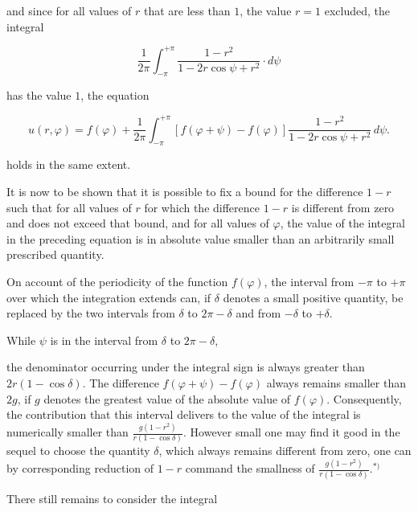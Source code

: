 \documentclass{article}
\begin{document}
and since for all values of $r$ that are less than $1$, the value $r = 1$ excluded, the integral

\[

\frac{1}{2\pi} \int_{-\pi}^{+\pi} \frac{1 - r^2}{1 - 2r \cos\psi + r^2} \cdot d\psi

\]

has the value $1$, the equation

\[

u(r, \varphi) = f(\varphi) + \frac{1}{2\pi} \int_{-\pi}^{+\pi} [f(\varphi + \psi) - f(\varphi)] \frac{1 - r^2}{1 - 2r \cos\psi + r^2}\,d\psi.

\]

holds in the same extent.



It is now to be shown that it is possible to fix a bound for the difference $1 - r$ such that for all values of $r$ for which the difference $1 - r$ is different from zero and does not exceed that bound, and for all values of $\varphi$, the value of the integral in the preceding equation is in absolute value smaller than an arbitrarily small prescribed quantity.



On account of the periodicity of the function $f(\varphi)$, the interval from $-\pi$ to $+\pi$ over which the integration extends can, if $\delta$ denotes a small positive quantity, be replaced by the two intervals from $\delta$ to $2\pi - \delta$ and from $-\delta$ to $+\delta$.



While $\psi$ is in the interval from $\delta$ to $2\pi - \delta$,




the denominator occurring under the integral sign is always greater than $2r(1 - \cos\delta)$. The difference $f(\varphi + \psi) - f(\varphi)$ always remains smaller than $2g$, if $g$ denotes the greatest value of the absolute value of $f(\varphi)$. Consequently, the contribution that this interval delivers to the value of the integral is numerically smaller than $\frac{g(1 - r^2)}{r(1 - \cos\delta)}$. However small one may find it good in the sequel to choose the quantity $\delta$, which always remains different from zero, one can by corresponding reduction of $1 - r$ command the smallness of $\frac{g(1 - r^2)}{r(1 - \cos\delta)}$.${}^{*)}$



There still remains to consider the integral
\end{document}
